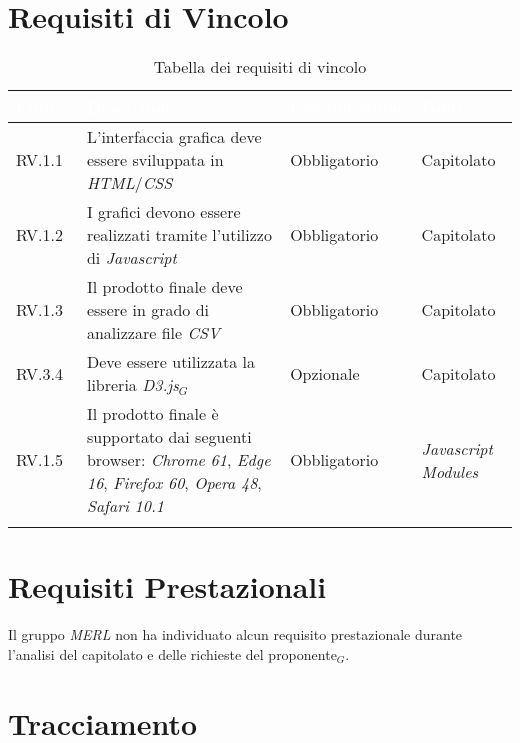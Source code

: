 \section{Requisiti di Vincolo}
\begin{center}
  \centering
  \begin{longtable}{|L{2cm}|C{5,5cm}|C{3cm}|C{2cm}|}
    \hline
    \textcolor[HTML]{FFFFFF}{\textbf{Codice}} & \textcolor[HTML]{FFFFFF}{\textbf{Descrizione}} & \textcolor[HTML]{FFFFFF}{\textbf{Classificazione}} & \textcolor[HTML]{FFFFFF}{\textbf{Fonti}}
    \\ \hline
    RV.1.1 & L'interfaccia grafica deve essere sviluppata in \textit{HTML}/\textit{CSS} & Obbligatorio & Capitolato \\ \hline
    RV.1.2 & I grafici devono essere realizzati tramite l'utilizzo di \textit{Javascript} & Obbligatorio & Capitolato \\ \hline
    RV.1.3 & Il prodotto finale deve essere in grado di analizzare file \textit{CSV} & Obbligatorio & Capitolato \\ \hline
    RV.3.4 & Deve essere utilizzata la libreria \textit{D3.js}$_G$ & Opzionale & Capitolato \\ \hline
    RV.1.5 & Il prodotto finale è supportato dai seguenti browser: \textit{Chrome 61}, \textit{Edge 16}, \textit{Firefox 60}, \textit{Opera 48}, \textit{Safari 10.1} & Obbligatorio & \textit{Javascript Modules} \\ \hline


    \caption{Tabella dei requisiti di vincolo}
  \end{longtable}
\end{center}

\section{Requisiti Prestazionali}
Il gruppo \textit{MERL} non ha individuato alcun requisito prestazionale durante l'analisi del capitolato e delle richieste del proponente$_G$.


\section{Tracciamento}


